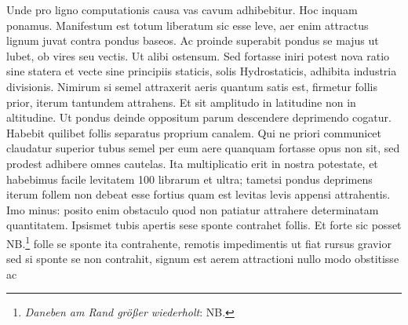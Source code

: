 Unde pro  ligno computationis causa vas cavum adhibebitur. Hoc inquam ponamus. Manifestum est  totum liberatum sic esse leve, aer enim attractus lignum juvat contra pondus baseos.  Ac proinde superabit pondus se majus ut lubet, ob vires  seu vectis\protect{}. Ut alibi ostensum. Sed fortasse iniri potest nova ratio sine statera\protect{} et vecte\protect{} sine principiis staticis\protect{}, solis Hydrostaticis\protect{}, adhibita industria divisionis. Nimirum si semel attraxerit aeris quantum satis est, firmetur follis prior, iterum tantundem attrahens. Et sit amplitudo in latitudine non in altitudine. Ut pondus deinde  oppositum parum descendere deprimendo cogatur. Habebit quilibet follis  separatus proprium canalem. Qui ne priori communicet claudatur superior  tubus semel  per eum aere quanquam fortasse opus non sit, sed prodest  adhibere omnes cautelas. Ita multiplicatio erit in nostra potestate, et habebimus facile levitatem 100 librarum et ultra; tametsi pondus deprimens iterum follem non debeat esse fortius quam est levitas levis appensi attrahentis. Imo minus: posito enim obstaculo quod non patiatur attrahere  determinatam quantitatem. Ipsismet  tubis apertis sese sponte contrahet follis. Et forte sic posset  NB.\footnote{\textit{Daneben am Rand gr\"{o}ßer wiederholt}: NB.} folle se sponte ita contrahente, remotis impedimentis ut fiat rursus gravior  sed si sponte se non contrahit, signum est aerem attractioni nullo modo obstitisse ac